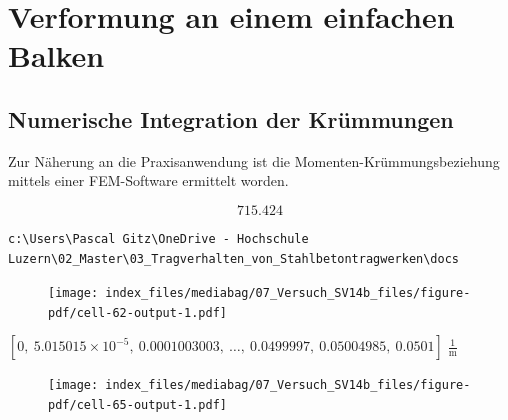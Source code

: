 \documentclass[
  letterpaper,
]{scrreprt}
\begin{document}

\hypertarget{verformung-an-einem-einfachen-balken}{%
\chapter{Verformung an einem einfachen
Balken}\label{verformung-an-einem-einfachen-balken}}

\hypertarget{numerische-integration-der-kruxfcmmungen}{%
\section{Numerische Integration der
Krümmungen}\label{numerische-integration-der-kruxfcmmungen}}

Zur Näherung an die Praxisanwendung ist die Momenten-Krümmungsbeziehung
mittels einer FEM-Software ermittelt worden.

\begin{equation}715.424\end{equation}

\begin{verbatim}
c:\Users\Pascal Gitz\OneDrive - Hochschule Luzern\02_Master\03_Tragverhalten_von_Stahlbetontragwerken\docs
\end{verbatim}

\begin{figure}[H]

{\centering \texttt{[image: index\_files/mediabag/07\_Versuch\_SV14b\_files/figure-pdf/cell-62-output-1.pdf]}

}

\end{figure}

$[0,~5.015015 \times 10^{-5},~0.0001003003,~\dots,~0.0499997,~0.05004985,~0.0501] \; \mathrm{\frac{1}{m}}$

\begin{figure}[H]

{\centering \texttt{[image: index\_files/mediabag/07\_Versuch\_SV14b\_files/figure-pdf/cell-65-output-1.pdf]}

}

\end{figure}
\end{document}
